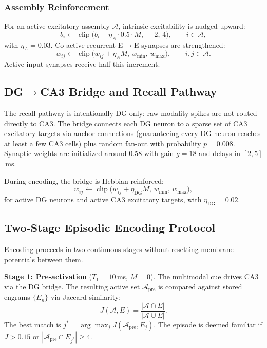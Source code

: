 \subsubsection{Assembly Reinforcement}

For an active excitatory assembly $\mathcal{A}$, intrinsic excitability is nudged upward:
\begin{equation}
b_i \leftarrow \operatorname{clip}\bigl(b_i + \eta_A \cdot 0.5 \cdot M,\, -2,\, 4\bigr), \qquad i \in \mathcal{A},
\end{equation}
with $\eta_A = 0.03$. Co-active recurrent E$\rightarrow$E synapses are strengthened:
\begin{equation}
w_{ij} \leftarrow \operatorname{clip}\bigl(w_{ij} + \eta_A M,\, w_{\min},\, w_{\max}\bigr), \qquad i,j \in \mathcal{A}.
\end{equation}
Active input synapses receive half this increment.


\subsection{DG$\rightarrow$CA3 Bridge and Recall Pathway}
\label{sec:bridge}

The recall pathway is intentionally DG-only: raw modality spikes are not routed directly to CA3. The bridge connects each DG neuron to a sparse set of CA3 excitatory targets via anchor connections (guaranteeing every DG neuron reaches at least a few CA3 cells) plus random fan-out with probability $p=0.008$. Synaptic weights are initialized around $0.58$ with gain $g=18$ and delays in $[2, 5]$\,ms.

During encoding, the bridge is Hebbian-reinforced:
\begin{equation}
w_{ij} \leftarrow \operatorname{clip}\bigl(w_{ij} + \eta_{\mathrm{DG}} M,\, w_{\min},\, w_{\max}\bigr),
\end{equation}
for active DG neurons and active CA3 excitatory targets, with $\eta_{\mathrm{DG}} = 0.02$.


\subsection{Two-Stage Episodic Encoding Protocol}
\label{sec:encoding}

Encoding proceeds in two continuous stages without resetting membrane potentials between them.

\textbf{Stage 1: Pre-activation} ($T_1 = 10$\,ms, $M=0$). The multimodal cue drives CA3 via the DG bridge. The resulting active set $\mathcal{A}_{\mathrm{pre}}$ is compared against stored engrams $\{E_n\}$ via Jaccard similarity:
\begin{equation}
J(\mathcal{A}, E) = \frac{|\mathcal{A} \cap E|}{|\mathcal{A} \cup E|}.
\end{equation}
The best match is $j^* = \arg\max_j J(\mathcal{A}_{\mathrm{pre}}, E_j)$. The episode is deemed familiar if $J > 0.15$ or $|\mathcal{A}_{\mathrm{pre}} \cap E_{j^*}| \geq 4$.

